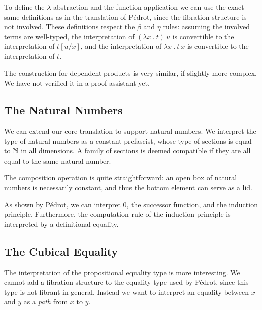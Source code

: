 
To define the \( λ \)-abstraction and the function application we can use the
exact same definitions as in the translation of Pédrot, since the fibration structure
is not involved.
% 
These definitions respect the \( \beta \) and \( \eta \) rules: assuming the
involved terms are well-typed, the interpretation of \( (λx\ .\ t)\ u \) is 
convertible to the interpretation of \( t[u/x] \), and the interpretation
of \( λx\ .\ t\ x \) is convertible to the interpretation of \( t \).

The construction for dependent products is very similar, if slightly more
complex. We have not verified it in a proof assistant yet.

\subsection{The Natural Numbers}

We can extend our core translation to support natural numbers.
We interpret the type of natural numbers as a constant prefascist, whose type of
sections is equal to \( \mathbb{N} \) in all dimensions. A family of sections is 
deemed compatible if they are all equal to the same natural number.



The composition operation is quite straightforward: an open box of natural 
numbers is necessarily constant, and thus the bottom element can serve as
a lid.

As shown by Pédrot, we can interpret 0, the successor function, and the
induction principle. Furthermore, the computation rule of the induction
principle is interpreted by a definitional equality.

\subsection{The Cubical Equality}

The interpretation of the propositional equality type is more 
interesting. We cannot add a fibration structure to the equality type used by Pédrot, 
since this type is not fibrant in general. 
% 
Instead we want to interpret an equality between \( x \) and \( y \) as a
\emph{path} from \( x \) to \( y \). 

